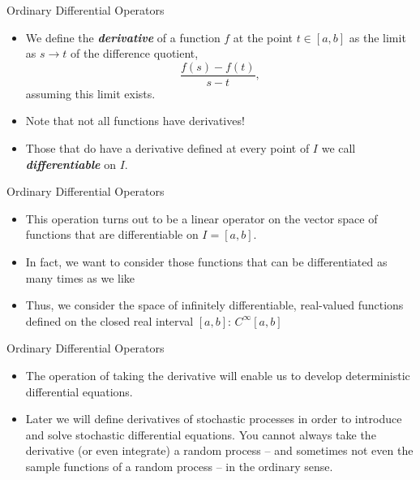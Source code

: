 \begin{frame}
Ordinary Differential Operators
 
\begin{itemize}
  
\item We define the \textbf{\textit{derivative}} of a function $f$ at the point $t\in [a,b]$ as the 
limit as $s\rightarrow
 t$ of the difference quotient,
 \[\frac{f(s)-f(t)}{s-t},\]
assuming this limit exists.
  
\item Note that not all functions have derivatives!
  
\item Those that do have a derivative defined at every point of $I$ we call \textbf{\textit{differentiable}} on $I$.

\end{itemize} 

\end{frame}



\begin{frame}
Ordinary Differential Operators
 
\begin{itemize}
  
\item This operation turns out to be a linear operator on the vector space of functions that are differentiable 
on $I=[a,b]$.
  
\item In fact, we want to consider those functions that can be differentiated as many times as we like
  
\item Thus, we consider the space of infinitely differentiable, real-valued functions defined on the 
closed real interval $[a,b]$: $C^\infty[a,b]$
\end{itemize}

\end{frame}



\begin{frame}
Ordinary Differential Operators
 
\begin{itemize}
 
\item The operation of taking the derivative will enable us to develop deterministic differential
 equations.
 
\item Later we will define derivatives of stochastic processes in order to introduce and solve stochastic 
differential equations.  You cannot always take the derivative (or even integrate) a random process -- 
and sometimes not even the sample functions of a random process -- in the ordinary sense.

\end{itemize}

\end{frame}


